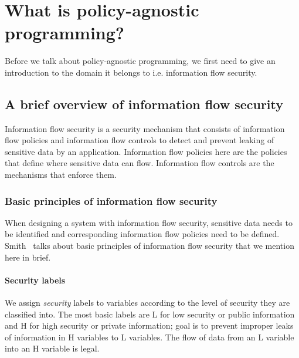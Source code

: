 \chapter{What is policy-agnostic programming?\label{chap:PAP}}

Before we talk about policy-agnostic programming, we first need to give an
introduction to the domain it belongs to i.e. information flow security.

\section{A brief overview of information flow security}

Information flow security is a security mechanism that consists of information flow
policies and information flow controls to detect and prevent leaking of sensitive
data by an application. Information flow policies here are the policies that define
where sensitive data can flow. Information flow controls are the mechanisms that
enforce them.

\subsection{Basic principles of information flow security}
When designing a system with information flow security, sensitive data needs to
be identified and corresponding information flow policies need to be defined.
Smith~\cite{PrincInfoSec} talks about basic principles of information flow security
that we mention here in brief.
\subsubsection{Security labels}
We assign \textit{security} labels to variables
according to the level of security they are classified into. The most basic labels
are L for low security or public information and H for high security or private
information; goal is to prevent improper leaks of information in H variables to
L variables. The flow of data from an L variable into an H variable is legal.

